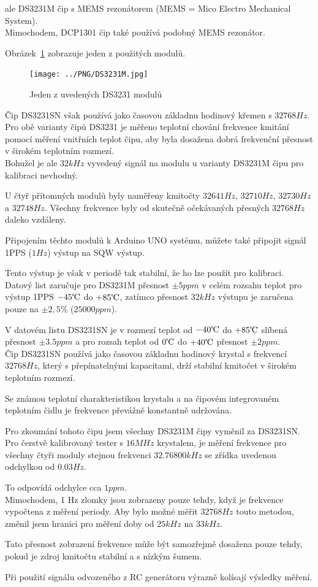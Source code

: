 ale DS3231M čip s MEMS rezonátorem (MEMS = Mico Electro Mechanical System).
\\Mimochodem, DCP1301 čip také používá podobný MEMS rezonátor.

Obrázek~\ref{fig:DS3231M} zobrazuje jeden z použitých modulů.

\begin{figure}[H]
\centering
\texttt{[image: ../PNG/DS3231M.jpg]}
\caption{Jeden z uvedených DS3231 modulů}
\label{fig:DS3231M}
\end{figure}

Čip DS3231SN však používá jako časovou základnu hodinový křemen s \(32768Hz\).\\
Pro obě varianty čipů DS3231 je měřeno teplotní chování frekvence kmitání pomocí měření vnitřních teplot čipu,
aby byla dosažena dobrá frekvenční přesnost v širokém teplotním rozmezí.\\
Bohužel je ale \(32kHz\) vyvedený signál na modulu u varianty DS3231M čipu pro kalibraci nevhodný.

U čtyř přítomných modulů byly naměřeny kmitočty \(32641Hz\), \(32710Hz\), \(32730Hz\) a \(32748Hz\).
Všechny frekvence byly od skutečně očekávaných přesných \(32768Hz\) daleko vzdáleny.

Připojením těchto modulů k Arduino UNO systému, můžete také připojit signál 1PPS (\(1Hz\)) výstup na SQW výstup.

Tento výstup je však v periodě tak stabilní, že ho lze použít pro kalibraci.
\\Datový list zaručuje pro DS3231M přesnost \(\pm 5ppm\) v celém rozsahu teplot pro výstup 1PPS \(-45\celsius\)  do \(+85\celsius\), zatímco přesnost \(32kHz\) výstupu je zaručena pouze na \(\pm 2,5\%\) (\(25000ppm\)).

V datovém listu DS3231SN je v rozmezí teplot od \(-40\celsius\) do \(+85\celsius\) slíbená
přesnost \(\pm 3.5ppm\) a pro rozsah teplot od \(0\celsius\) do \(+40\celsius\) přesnost \(\pm 2ppm\).
\\Čip DS3231SN používá jako časovou základnu hodinový krystal s frekvencí \(32768Hz\), který s přepínatelnými kapacitami, drží stabilní kmitočet v širokém teplotním rozmezí.

Se známou teplotní charakteristikou krystalu a na čipovém integrovaném teplotním čidlu je frekvence převážně konstantně udržována.

Pro zkoumání tohoto čipu jsem všechny DS3231M čipy vyměnil za DS3231SN.
\\Pro čerstvě kalibrovaný tester s \(16MHz\) krystalem, je měření frekvence pro všechny
čtyři moduly stejnou frekvenci \(32.76800kHz\) se zřídka uvedenou odchylkou od \(0.03Hz\).

To odpovídá odchylce cca \(1ppm\).
\\Mimochodem, 1 Hz zlomky jsou zobrazeny pouze tehdy, když je frekvence vypočtena z měření periody.
Aby bylo možné měřit \(32768Hz\) touto metodou, změnil jsem hranici pro měření doby od \(25kHz\) na \(33kHz\).

Tato přesnost zobrazení frekvence může být samozřejmě dosažena pouze tehdy, pokud je zdroj kmitočtu stabilní a s nízkým šumem.

Při použití signálu odvozeného z RC generátoru výrazně kolísají výsledky měření.
